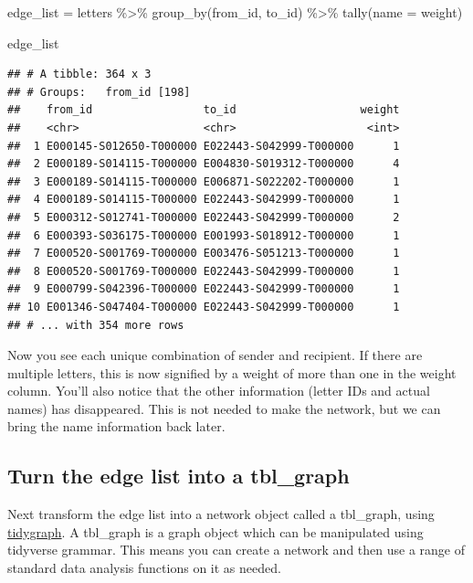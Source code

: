 \documentclass[
]{book}
\newenvironment{Shaded}{\begin{snugshade}}{\end{snugshade}}
\newcommand{\AttributeTok}[1]{\textcolor[rgb]{0.77,0.63,0.00}{#1}}
\newcommand{\FunctionTok}[1]{\textcolor[rgb]{0.00,0.00,0.00}{#1}}
\newcommand{\NormalTok}[1]{#1}
\newcommand{\OtherTok}[1]{\textcolor[rgb]{0.56,0.35,0.01}{#1}}
\newcommand{\SpecialCharTok}[1]{\textcolor[rgb]{0.00,0.00,0.00}{#1}}
\newcommand{\StringTok}[1]{\textcolor[rgb]{0.31,0.60,0.02}{#1}}
\begin{document}
\begin{Shaded}
\begin{Highlighting}[]
\NormalTok{edge\_list }\OtherTok{=}\NormalTok{ letters }\SpecialCharTok{\%\textgreater{}\%} 
  \FunctionTok{group\_by}\NormalTok{(from\_id, to\_id) }\SpecialCharTok{\%\textgreater{}\%} 
  \FunctionTok{tally}\NormalTok{(}\AttributeTok{name =} \StringTok{\textquotesingle{}weight\textquotesingle{}}\NormalTok{)}

\NormalTok{edge\_list}
\end{Highlighting}
\end{Shaded}

\begin{verbatim}
## # A tibble: 364 x 3
## # Groups:   from_id [198]
##    from_id                 to_id                   weight
##    <chr>                   <chr>                    <int>
##  1 E000145-S012650-T000000 E022443-S042999-T000000      1
##  2 E000189-S014115-T000000 E004830-S019312-T000000      4
##  3 E000189-S014115-T000000 E006871-S022202-T000000      1
##  4 E000189-S014115-T000000 E022443-S042999-T000000      1
##  5 E000312-S012741-T000000 E022443-S042999-T000000      2
##  6 E000393-S036175-T000000 E001993-S018912-T000000      1
##  7 E000520-S001769-T000000 E003476-S051213-T000000      1
##  8 E000520-S001769-T000000 E022443-S042999-T000000      1
##  9 E000799-S042396-T000000 E022443-S042999-T000000      1
## 10 E001346-S047404-T000000 E022443-S042999-T000000      1
## # ... with 354 more rows
\end{verbatim}

Now you see each unique combination of sender and recipient. If there are multiple letters, this is now signified by a weight of more than one in the weight column. You'll also notice that the other information (letter IDs and actual names) has disappeared. This is not needed to make the network, but we can bring the name information back later.

\hypertarget{turn-the-edge-list-into-a-tbl_graph}{%
\subsection{Turn the edge list into a tbl\_graph}\label{turn-the-edge-list-into-a-tbl_graph}}

Next transform the edge list into a network object called a tbl\_graph, using \href{https://www.data-imaginist.com/2017/introducing-tidygraph/}{tidygraph}. A tbl\_graph is a graph object which can be manipulated using tidyverse grammar. This means you can create a network and then use a range of standard data analysis functions on it as needed.
\end{document}
